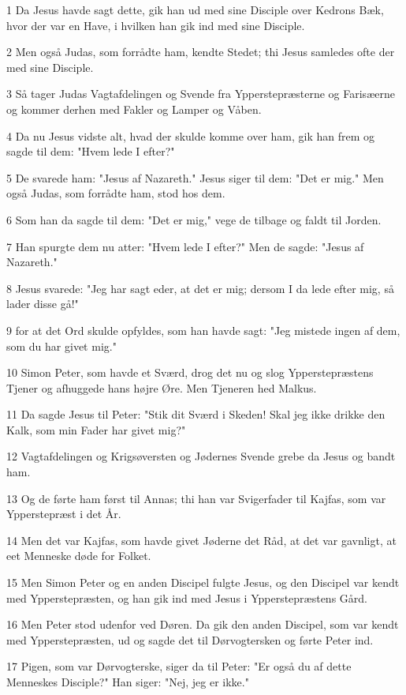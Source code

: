 \par 1 Da Jesus havde sagt dette, gik han ud med sine Disciple over Kedrons Bæk, hvor der var en Have, i hvilken han gik ind med sine Disciple.
\par 2 Men også Judas, som forrådte ham, kendte Stedet; thi Jesus samledes ofte der med sine Disciple.
\par 3 Så tager Judas Vagtafdelingen og Svende fra Ypperstepræsterne og Farisæerne og kommer derhen med Fakler og Lamper og Våben.
\par 4 Da nu Jesus vidste alt, hvad der skulde komme over ham, gik han frem og sagde til dem: "Hvem lede I efter?"
\par 5 De svarede ham: "Jesus af Nazareth." Jesus siger til dem: "Det er mig." Men også Judas, som forrådte ham, stod hos dem.
\par 6 Som han da sagde til dem: "Det er mig," vege de tilbage og faldt til Jorden.
\par 7 Han spurgte dem nu atter: "Hvem lede I efter?" Men de sagde: "Jesus af Nazareth."
\par 8 Jesus svarede: "Jeg har sagt eder, at det er mig; dersom I da lede efter mig, så lader disse gå!"
\par 9 for at det Ord skulde opfyldes, som han havde sagt: "Jeg mistede ingen af dem, som du har givet mig."
\par 10 Simon Peter, som havde et Sværd, drog det nu og slog Ypperstepræstens Tjener og afhuggede hans højre Øre. Men Tjeneren hed Malkus.
\par 11 Da sagde Jesus til Peter: "Stik dit Sværd i Skeden! Skal jeg ikke drikke den Kalk, som min Fader har givet mig?"
\par 12 Vagtafdelingen og Krigsøversten og Jødernes Svende grebe da Jesus og bandt ham.
\par 13 Og de førte ham først til Annas; thi han var Svigerfader til Kajfas, som var Ypperstepræst i det År.
\par 14 Men det var Kajfas, som havde givet Jøderne det Råd, at det var gavnligt, at eet Menneske døde for Folket.
\par 15 Men Simon Peter og en anden Discipel fulgte Jesus, og den Discipel var kendt med Ypperstepræsten, og han gik ind med Jesus i Ypperstepræstens Gård.
\par 16 Men Peter stod udenfor ved Døren. Da gik den anden Discipel, som var kendt med Ypperstepræsten, ud og sagde det til Dørvogtersken og førte Peter ind.
\par 17 Pigen, som var Dørvogterske, siger da til Peter: "Er også du af dette Menneskes Disciple?" Han siger: "Nej, jeg er ikke."

